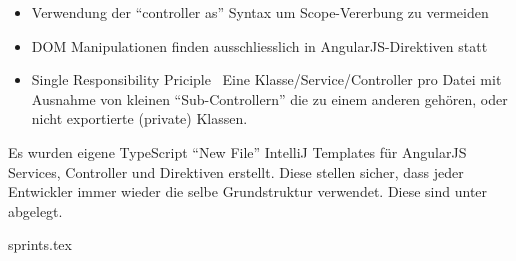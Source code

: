 \begin{itemize}
	\item Verwendung der ``controller as'' Syntax um Scope-Vererbung zu vermeiden
	\item DOM Manipulationen finden ausschliesslich in AngularJS-Direktiven statt
	\item Single Responsibility Priciple \textendash\ Eine Klasse/Service/Controller pro Datei mit Ausnahme von kleinen ``Sub-Controllern'' die zu einem anderen gehören, oder nicht exportierte (private) Klassen.
\end{itemize}

Es wurden eigene TypeScript ``New File'' IntelliJ Templates für AngularJS Services, Controller und Direktiven erstellt. Diese stellen sicher, dass jeder Entwickler immer wieder die selbe Grundstruktur verwendet. Diese sind unter  abgelegt.



{sprints.tex}


